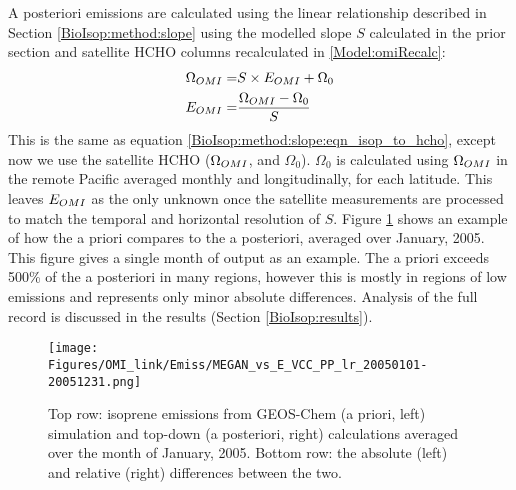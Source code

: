     
    A posteriori emissions are calculated using the linear relationship described in Section \ref{BioIsop:method:slope} using the modelled slope $S$ calculated in the prior section and satellite HCHO columns recalculated in \ref{Model:omiRecalc}:
    \begin{eqnarray} \begin{split}
      \label{BioIsop:method:eqn_Enew}
      \Omega_{OMI} = & S \times E_{OMI} + \Omega_0 \\
      E_{OMI} = & \frac{\Omega_{OMI} - \Omega_{0}}{S}
    \end{split} \end{eqnarray} 
    This is the same as equation \ref{BioIsop:method:slope:eqn_isop_to_hcho}, except now we use the satellite HCHO ($\Omega_{OMI}$, and $\Omega_0$).
    $\Omega_0$ is calculated using $\Omega_{OMI}$ in the remote Pacific averaged monthly and longitudinally, for each latitude.
    This leaves $E_{OMI}$ as the only unknown once the satellite measurements are processed to match the temporal and horizontal resolution of $S$.
    Figure \ref{BioIsop:method:calculation:fig_E_isop_200501} shows an example of how the a priori compares to the a posteriori, averaged over January, 2005.
    This figure gives a single month of output as an example.
    The a priori exceeds 500\% of the a posteriori in many regions, however this is mostly in regions of low emissions and represents only minor absolute differences. 
    Analysis of the full record is discussed in the results (Section \ref{BioIsop:results}).
    
    
    
    \begin{figure}
      \texttt{[image: Figures/OMI\_link/Emiss/MEGAN\_vs\_E\_VCC\_PP\_lr\_20050101-20051231.png]}
      \caption{%
        Top row: isoprene emissions from GEOS-Chem (a priori, left) simulation and top-down (a posteriori, right) calculations averaged over the month of January, 2005.
        Bottom row: the absolute (left) and relative (right) differences between the two.
      }
      \label{BioIsop:method:calculation:fig_E_isop_200501}
    \end{figure}
    
